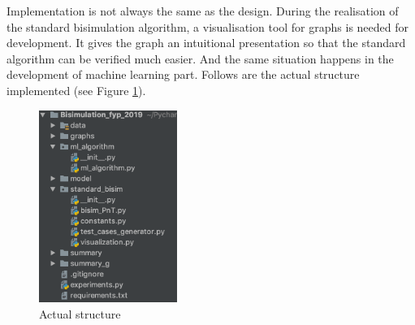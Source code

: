 


Implementation is not always the same as the design.
During the realisation of the standard bisimulation algorithm, a visualisation tool for graphs is needed for development. 
It gives the graph an intuitional presentation so that the standard algorithm can be verified much easier.
And the same situation happens in the development of machine learning part.
Follows are the actual structure implemented (see Figure \ref{fig:actual_str}).
\begin{figure}[h]
    \centering
    \includegraphics[width=0.4\textwidth]{img/actual_str.png}
    \caption{Actual structure}
    \label{fig:actual_str}
\end{figure}

